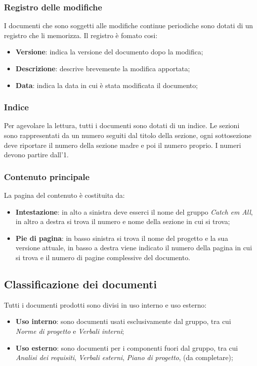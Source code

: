 \subsubsection{Registro delle modifiche}
I documenti che sono soggetti alle modifiche continue periodiche sono dotati di un registro che li memorizza. Il registro è fomato cosi:
\begin{itemize}
    \item \textbf{Versione}: indica la versione del documento dopo la modifica;
    \item \textbf{Descrizione}: descrive brevemente la modifica apportata;
    \item \textbf{Data}: indica la data in cui è stata modificata il documento;
\end{itemize}

\subsubsection{Indice}
Per agevolare la lettura, tutti i documenti sono dotati di un indice. Le sezioni sono rappresentati da un numero seguiti dal titolo della sezione, ogni sottosezione deve riportare il numero della sezione madre e poi il numero proprio. I numeri devono partire dall'1.

\subsubsection{Contenuto principale}
La pagina del contenuto è costituita da:
\begin{itemize}
    \item \textbf{Intestazione}: in alto a sinistra deve esserci il nome del gruppo \textit{Catch em All}, in altro a destra si trova il numero e nome della sezione in cui si trova;
    \item \textbf{Pie di pagina}: in basso sinistra si trova il nome del progetto e la sua versione attuale, in basso a destra viene indicato il numero della pagina in cui si trova e il numero di pagine complessive del documento.
\end{itemize}

\subsection{Classificazione dei documenti}
Tutti i documenti prodotti sono divisi in uso interno e uso esterno:
\begin{itemize}
    \item \textbf{Uso interno}: sono documenti usati esclusivamente dal gruppo, tra cui \textit{Norme di progetto} e \textit{Verbali interni};
    \item \textbf{Uso esterno}: sono documenti per i componenti fuori dal gruppo, tra cui \textit{Analisi dei requisiti}, \textit{Verbali esterni}, \textit{Piano di progetto}, (da completare);
\end{itemize}



